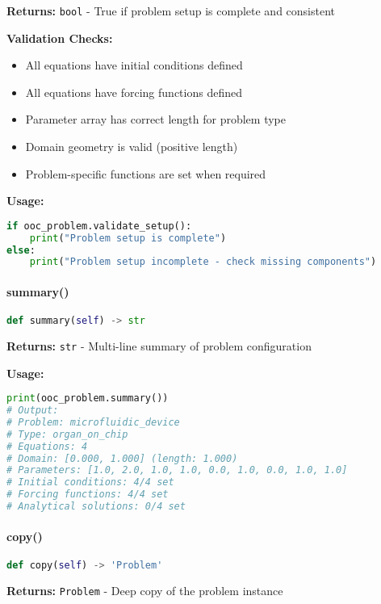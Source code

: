 \textbf{Returns:} \texttt{bool} - True if problem setup is complete and consistent

\textbf{Validation Checks:}
\begin{itemize}
    \item All equations have initial conditions defined
    \item All equations have forcing functions defined
    \item Parameter array has correct length for problem type
    \item Domain geometry is valid (positive length)
    \item Problem-specific functions are set when required
\end{itemize}

\textbf{Usage:}
\begin{lstlisting}[language=Python]
if ooc_problem.validate_setup():
    print("Problem setup is complete")
else:
    print("Problem setup incomplete - check missing components")
\end{lstlisting}

\paragraph{summary()}
\begin{lstlisting}[language=Python, caption=Problem Summary Method]
def summary(self) -> str
\end{lstlisting}

\textbf{Returns:} \texttt{str} - Multi-line summary of problem configuration

\textbf{Usage:}
\begin{lstlisting}[language=Python]
print(ooc_problem.summary())
# Output:
# Problem: microfluidic_device
# Type: organ_on_chip
# Equations: 4
# Domain: [0.000, 1.000] (length: 1.000)
# Parameters: [1.0, 2.0, 1.0, 1.0, 0.0, 1.0, 0.0, 1.0, 1.0]
# Initial conditions: 4/4 set
# Forcing functions: 4/4 set
# Analytical solutions: 0/4 set
\end{lstlisting}

\paragraph{copy()}
\begin{lstlisting}[language=Python, caption=Problem Copy Method]
def copy(self) -> 'Problem'
\end{lstlisting}

\textbf{Returns:} \texttt{Problem} - Deep copy of the problem instance

